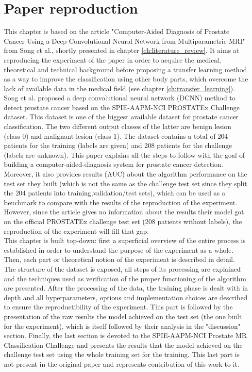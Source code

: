 
\chapter{Paper reproduction}
\label{ch:paper_reproduction}
This chapter is based on the article "Computer-Aided Diagnosis of Prostate Cancer Using a Deep Convolutional Neural Network from Multiparametric MRI" from Song et al.\cite{07}, shortly presented in chapter \ref{ch:literature_review}. It aims at reproducing the experiment of the paper in order to acquire the medical, theoretical and technical background before proposing a transfer learning method as a way to improve the classification using other body parts, which overcome the lack of available data in the medical field (see chapter \ref{ch:transfer_learning}).\\
Song et al. \cite{07} proposed a deep convolutional neural network (DCNN) method to detect prostate cancer based on the SPIE-AAPM-NCI PROSTATEx Challenge dataset. This dataset is one of the biggest available dataset for prostate cancer classification. The two different output classes of the latter are benign lesion (class 0) and malignant lesion (class 1). The dataset contains a total of 204 patients for the training (labels are given) and 208 patients for the challenge (labels are unknown). This paper explains all the steps to follow with the goal of building a computer-aided-diagnosis system for prostate cancer detection. Moreover, it also provides results (AUC) about the algorithm performance on the test set they built (which is not the same as the challenge test set since they split the 204 patients into training,validation/test sets), which can be used as a benchmark to compare with the results of the reproduction of the experiment. However, since the article gives no information about the results their model got on the official PROSTATEx challenge test set (208 patients without labels), the reproduction of the experiment will fill that gap.\\
This chapter is built top-down: first a superficial overview of the entire process is established in order to understand the purpose of the experiment as a whole. Then, each part or theoretical notion of the experiment is described in detail. The structure of the dataset is exposed, all steps of its processing are explained and the techniques used as verification of the proper functioning of the algorithm are presented. After the processing of the data, the training phase is dealt with in depth and all hyperparameters, options and implementation choices are described to ensure the reproductibility of the experiment. This part is followed by the presentation of the raw results the model achieved on the test set (the one built for the experiment), which is itself followed by their analysis in the "discussion" section. Finally, the last section is devoted to the SPIE-AAPM-NCI Prostate MR Classification Challenge and presents the results that the model achieved on the challenge test set using the whole training set for the training. This last part is not present in the original paper and represents contribution of this work to it.

